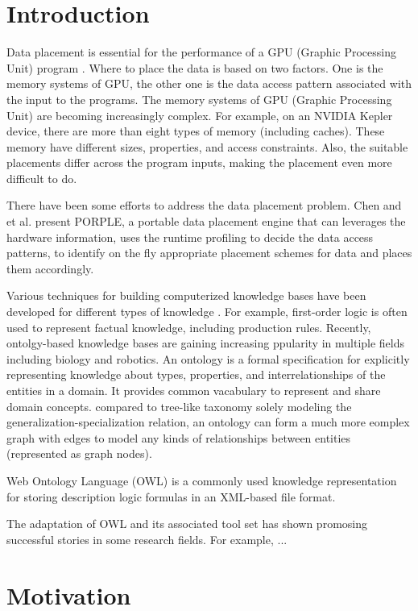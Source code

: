 \documentclass{sig-alternate}
\begin{document}
\section{Introduction}
Data placement is essential for the performance of a GPU (Graphic Processing Unit) program \cite{intro1}. Where to place the data is based on two factors. One is the memory systems of GPU, the other one is the data access pattern associated with the input to the programs. The memory systems of GPU (Graphic Processing Unit) are becoming increasingly complex. For example, on an NVIDIA Kepler device, there are more than eight types of memory (including caches). These memory have different sizes, properties, and access constraints. Also, the suitable placements differ across the program inputs, making the placement even more difficult to do.

There have been some efforts to address the data placement problem. Chen and et al. \cite{porple} present PORPLE, a portable data placement engine that can leverages the hardware information, uses the runtime profiling to decide the data access patterns, to identify on the fly appropriate placement schemes for data and places them accordingly. 

Various techniques for building computerized knowledge bases have been developed for different types of knowledge \cite{intro2}. For example, first-order logic is often used to represent factual knowledge, including production rules. Recently, ontolgy-based knowledge bases are gaining increasing ppularity in multiple fields including biology and robotics. An ontology is a formal specification for explicitly representing knowledge about types, properties, and interrelationships of the entities in a domain. It provides common vacabulary to represent and share domain concepts. compared to tree-like taxonomy solely modeling the generalization-specialization relation, an ontology can form a much more eomplex graph with edges to model any kinds of relationships between entities (represented as graph nodes).

Web Ontology Language (OWL) \cite{owl1, owl2} is a commonly used knowledge representation for storing description logic formulas in an XML-based file format.

The adaptation of OWL and its associated tool set has shown promosing successful stories in some research fields. For example, ...

\section{Motivation}
\end{document}
